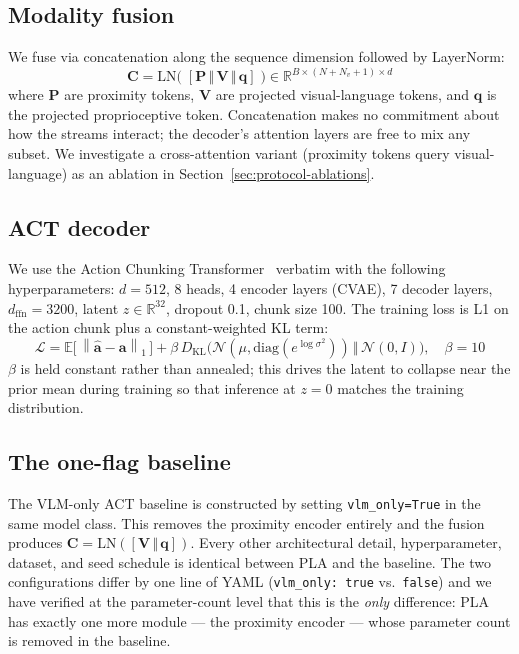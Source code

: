 \documentclass[11pt]{article}
\newcommand{\norm}[1]{\left\lVert#1\right\rVert}
\newcommand{\R}{\mathbb{R}}
\newcommand{\E}{\mathbb{E}}
\newcommand{\KL}{D_{\mathrm{KL}}}
\begin{document}
\subsection{Modality fusion}
\label{sec:method-fusion}

We fuse via concatenation along the sequence dimension followed by
LayerNorm:
\begin{equation}
\mathbf{C} = \mathrm{LN}\big(\;[\mathbf{P} \,\Vert\, \mathbf{V} \,\Vert\, \mathbf{q}]\;\big)
\in \R^{B \times (N + N_v + 1) \times d}
\end{equation}
where $\mathbf{P}$ are proximity tokens, $\mathbf{V}$ are projected
visual-language tokens, and $\mathbf{q}$ is the projected proprioceptive
token. Concatenation makes no commitment about how the streams interact;
the decoder's attention layers are free to mix any subset. We
investigate a cross-attention variant (proximity tokens query
visual-language) as an ablation in Section~\ref{sec:protocol-ablations}.

\subsection{ACT decoder}
\label{sec:method-act}

We use the Action Chunking
Transformer~\citep{zhao2023learning} verbatim with the following
hyperparameters: $d=512$, 8 heads, 4 encoder layers (CVAE), 7 decoder
layers, $d_\mathrm{ffn}=3200$, latent $z \in \R^{32}$, dropout 0.1,
chunk size 100. The training loss is L1 on the action chunk plus a
constant-weighted KL term:
\begin{equation}
\mathcal{L} = \E\big[\,\norm{\hat{\mathbf{a}} - \mathbf{a}}_1\,\big]
            + \beta\,\KL\!\big(\mathcal{N}(\mu, \mathrm{diag}(e^{\log \sigma^2})) \,\Vert\, \mathcal{N}(0, I)\big),
\quad \beta = 10
\label{eq:loss}
\end{equation}
$\beta$ is held constant rather than annealed; this drives the latent
to collapse near the prior mean during training so that inference at
$z = 0$ matches the training distribution.

\subsection{The one-flag baseline}
\label{sec:method-baseline}

The VLM-only ACT baseline is constructed by setting \verb|vlm_only=True|
in the same model class. This removes the proximity encoder entirely
and the fusion produces $\mathbf{C} = \mathrm{LN}([\mathbf{V} \,\Vert\,
\mathbf{q}])$. Every other architectural detail, hyperparameter, dataset,
and seed schedule is identical between PLA and the baseline. The two
configurations differ by one line of YAML
(\verb|vlm_only: true| vs.\ \verb|false|) and we have verified at the
parameter-count level that this is the \emph{only} difference: PLA has
exactly one more module --- the proximity encoder --- whose parameter
count is removed in the baseline.
\end{document}
